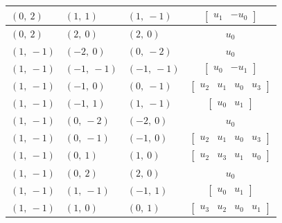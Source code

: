 \documentclass[11pt]{article}
\theoremstyle{definition}
\begin{document}
\begin{longtable}{|l|l|l|c|}
    \hline
    $\left( 0, \  2\right)$ & $\left( 1, \  1\right)$ & $\left( 1, \  -1\right)$ & $\left[\begin{matrix}u_{1} & - u_{0}\end{matrix}\right]$ \\
    \hline
    $\left( 0, \  2\right)$ & $\left( 2, \  0\right)$ & $\left( 2, \  0\right)$ & $u_{0}$ \\
    \hline
    $\left( 1, \  -1\right)$ & $\left( -2, \  0\right)$ & $\left( 0, \  -2\right)$ & $u_{0}$ \\
    \hline
    $\left( 1, \  -1\right)$ & $\left( -1, \  -1\right)$ & $\left( -1, \  -1\right)$ & $\left[\begin{matrix}u_{0} & - u_{1}\end{matrix}\right]$ \\
    \hline
    $\left( 1, \  -1\right)$ & $\left( -1, \  0\right)$ & $\left( 0, \  -1\right)$ & $\left[\begin{matrix}u_{2} & u_{1} & u_{0} & u_{3}\end{matrix}\right]$ \\
    \hline
    $\left( 1, \  -1\right)$ & $\left( -1, \  1\right)$ & $\left( 1, \  -1\right)$ & $\left[\begin{matrix}u_{0} & u_{1}\end{matrix}\right]$ \\
    \hline
    $\left( 1, \  -1\right)$ & $\left( 0, \  -2\right)$ & $\left( -2, \  0\right)$ & $u_{0}$ \\
    \hline
    $\left( 1, \  -1\right)$ & $\left( 0, \  -1\right)$ & $\left( -1, \  0\right)$ & $\left[\begin{matrix}u_{2} & u_{1} & u_{0} & u_{3}\end{matrix}\right]$ \\
    \hline
    $\left( 1, \  -1\right)$ & $\left( 0, \  1\right)$ & $\left( 1, \  0\right)$ & $\left[\begin{matrix}u_{2} & u_{3} & u_{1} & u_{0}\end{matrix}\right]$ \\
    \hline
    $\left( 1, \  -1\right)$ & $\left( 0, \  2\right)$ & $\left( 2, \  0\right)$ & $u_{0}$ \\
    \hline
    $\left( 1, \  -1\right)$ & $\left( 1, \  -1\right)$ & $\left( -1, \  1\right)$ & $\left[\begin{matrix}u_{0} & u_{1}\end{matrix}\right]$ \\
    \hline
    $\left( 1, \  -1\right)$ & $\left( 1, \  0\right)$ & $\left( 0, \  1\right)$ & $\left[\begin{matrix}u_{3} & u_{2} & u_{0} & u_{1}\end{matrix}\right]$ \\

\end{longtable}
\end{document}
